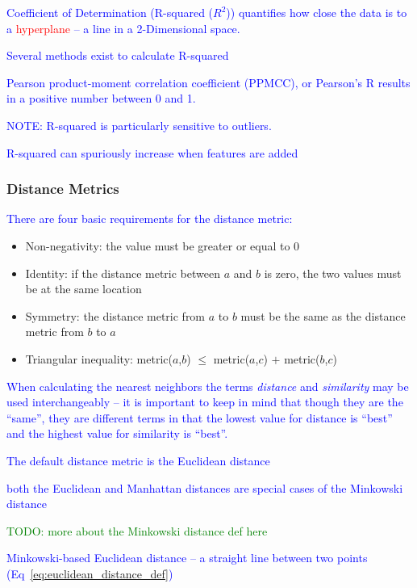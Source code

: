 \textcolor{blue}{Coefficient of Determination (R-squared ($R^2$)) quantifies how close the data is to a \textcolor{red}{hyperplane} -- a line in a 2-Dimensional space.}

\textcolor{blue}{Several methods exist to calculate R-squared}

\textcolor{blue}{Pearson product-moment correlation coefficient (PPMCC), or {Pearson's R} results in a positive number between 0 and 1.}

\textcolor{blue}{NOTE: R-squared is particularly sensitive to outliers.}

\textcolor{blue}{R-squared can spuriously increase when features are added}

\subsubsection{Distance Metrics}

\textcolor{blue}{There are four basic requirements for the distance metric:}

\begin{itemize}
	\item Non-negativity: the value must be greater or equal to 0
	\item Identity: if the distance metric between $a$ and $b$ is zero, the two values must be at the same location
	\item Symmetry: the distance metric from $a$ to $b$ must be the same as the distance metric from $b$ to $a$
	\item Triangular inequality: metric($a$,$b$) $\le$ metric($a$,$c$) $+$ metric($b$,$c$)
\end{itemize}

\textcolor{blue}{When calculating the nearest neighbors the terms \textit{distance} and \textit{similarity} may be used interchangeably -- it is important to keep in mind that though they are the ``same'', they are different terms in that the lowest value for distance is ``best'' and the highest value for similarity is ``best''.}

\textcolor{blue}{The default distance metric is the Euclidean distance}

\textcolor{blue}{both the Euclidean and Manhattan distances are special cases of the Minkowski distance}

\textcolor{green}{TODO: more about the Minkowski distance def here}

\textcolor{blue}{Minkowski-based Euclidean distance -- a straight line between two points (Eq~\ref{eq:euclidean_distance_def})}

